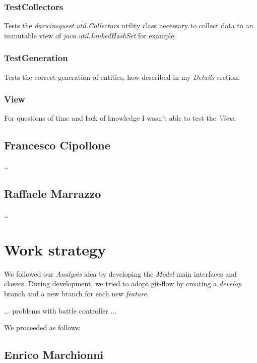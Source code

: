 \documentclass[12pt, a4paper]{report}
\theoremstyle{definition}
\begin{document}
    \subsubsection{TestCollectors}
    
    Tests the \emph{darwinsquest.util.Collectors} utility class necessary to collect data to an immutable view of \emph{java.util.LinkedHashSet} for example.

    \subsubsection{TestGeneration}
    
    Tests the correct generation of entities, how described in my \emph{Details} section.

    \subsubsection{View}

    For questions of time and lack of knowledge I wasn't able to test the \emph{View}.

    \subsection*{Francesco Cipollone}

    \dots

    \subsection*{Raffaele Marrazzo}

    \dots

\section{Work strategy}

    We followed our \emph{Analysis} idea by developing the \emph{Model} main interfaces and classes.
    During development, we tried to adopt git-flow by creating a \emph{develop} branch and a new branch for each new \emph{feature}.

    ... problems with battle controller ...

    We proceeded as follows:

    \subsection*{Enrico Marchionni}
\end{document}
